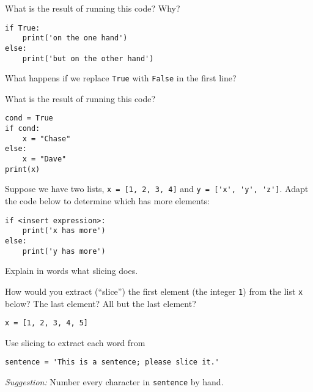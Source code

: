 \documentclass[11pt]{exam}
\begin{document}
\begin{questions}
\item What is the result of running this code?  Why?
\begin{verbatim}
if True:
    print('on the one hand')
else:
    print('but on the other hand')
\end{verbatim}
What happens if we replace {\tt True} with {\tt False} in the first line?

\item What is the result of running this code?
\begin{verbatim}
cond = True
if cond:
    x = "Chase"
else:
    x = "Dave"
print(x)
\end{verbatim}

\item Suppose we have two lists,
{\tt x = [1, 2, 3, 4]} and \verb|y = ['x', 'y', 'z']|.
Adapt the code below to determine which has more elements:
\begin{verbatim}
if <insert expression>:
    print('x has more')
else:
    print('y has more')
\end{verbatim}



\item Explain in words what slicing does.

\item How would you extract (``slice'') the first element (the integer {\tt 1}) from the list {\tt x} below?
The last element?  All but the last element?
\begin{verbatim}
x = [1, 2, 3, 4, 5]
\end{verbatim}

\item Use slicing to extract each word from
\begin{verbatim}
sentence = 'This is a sentence; please slice it.'
\end{verbatim}
{\it Suggestion:\/} Number every character in {\tt sentence} by hand.



\end{questions}
\end{document}
